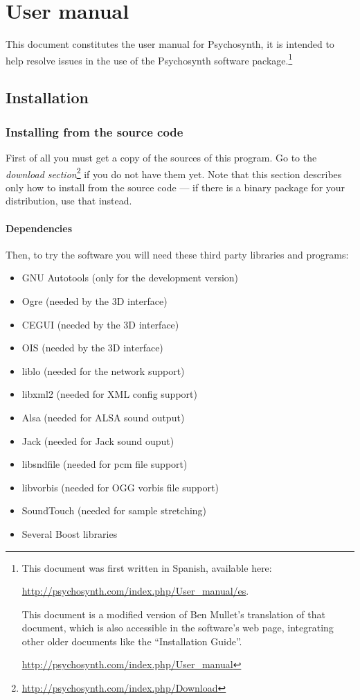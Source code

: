 
\chapter{User manual}

\label{sec:98-user}

This document constitutes the user manual for Psychosynth, it is
intended to help resolve issues in the use of the Psychosynth software
package.\footnote{This document was first written in Spanish,
  available here:

  \url{http://psychosynth.com/index.php/User_manual/es}. 

  This document is a modified version of Ben Mullet's translation of
  that document, which is also accessible in the software's web page,
  integrating other older documents like the ``Installation Guide''.

\url{http://psychosynth.com/index.php/User_manual}}

\section{Installation}

\subsection{Installing from the source code}

First of all you must get a copy of the sources of this program. Go to
the \emph{download
  section}\footnote{\url{http://psychosynth.com/index.php/Download}}
if you do not have them yet. Note that this section describes only how
to install from the source code --- if there is a binary package for
your distribution, use that instead.

\subsubsection{Dependencies}

Then, to try the software you will need these third party libraries
and programs:

\begin{itemize}
\item GNU Autotools (only for the development version) 
\item Ogre (needed by
  the 3D interface)
\item CEGUI (needed by the 3D interface)
\item OIS (needed by the 3D interface)
\item liblo (needed for the network support)
\item libxml2 (needed for XML config support)
\item Alsa (needed for ALSA sound output)
\item Jack (needed for Jack sound ouput) 
\item libsndfile (needed for
  pcm file support) 
\item libvorbis (needed for OGG vorbis file support)
\item SoundTouch (needed for sample stretching)
\item Several Boost libraries
\end{itemize}

